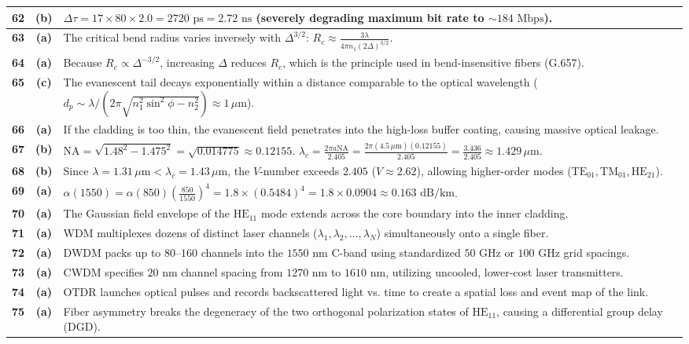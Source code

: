 {\begin{tabularx}{\textwidth}{|c|c|X|}
\textbf{62} & \textbf{(b)} & $\Delta\tau = 17 \times 80 \times 2.0 = 2720\text{ ps} = 2.72\text{ ns}$ (severely degrading maximum bit rate to $\sim 184\text{ Mbps}$). \\ \hline
\textbf{63} & \textbf{(a)} & The critical bend radius varies inversely with $\Delta^{3/2}$: $R_c \approx \frac{3\lambda}{4\pi n_1 (2\Delta)^{3/2}}$. \\ \hline
\textbf{64} & \textbf{(a)} & Because $R_c \propto \Delta^{-3/2}$, increasing $\Delta$ reduces $R_c$, which is the principle used in bend-insensitive fibers (G.657). \\ \hline
\textbf{65} & \textbf{(c)} & The evanescent tail decays exponentially within a distance comparable to the optical wavelength ($d_p \sim \lambda / (2\pi\sqrt{n_1^2\sin^2\phi - n_2^2}) \approx 1\,\mu\text{m}$). \\ \hline
\textbf{66} & \textbf{(a)} & If the cladding is too thin, the evanescent field penetrates into the high-loss buffer coating, causing massive optical leakage. \\ \hline
\textbf{67} & \textbf{(b)} & $\text{NA} = \sqrt{1.48^2 - 1.475^2} = \sqrt{0.014775} \approx 0.12155$. $\lambda_c = \frac{2\pi a \text{NA}}{2.405} = \frac{2\pi (4.5\,\mu\text{m})(0.12155)}{2.405} = \frac{3.436}{2.405} \approx 1.429\,\mu\text{m}$. \\ \hline
\textbf{68} & \textbf{(b)} & Since $\lambda = 1.31\,\mu\text{m} < \lambda_c = 1.43\,\mu\text{m}$, the $V$-number exceeds $2.405$ ($V \approx 2.62$), allowing higher-order modes ($\text{TE}_{01}, \text{TM}_{01}, \text{HE}_{21}$). \\ \hline
\textbf{69} & \textbf{(a)} & $\alpha(1550) = \alpha(850)\left(\frac{850}{1550}\right)^4 = 1.8 \times (0.5484)^4 = 1.8 \times 0.0904 \approx 0.163\text{ dB/km}$. \\ \hline
\textbf{70} & \textbf{(a)} & The Gaussian field envelope of the $\text{HE}_{11}$ mode extends across the core boundary into the inner cladding. \\ \hline
\textbf{71} & \textbf{(a)} & WDM multiplexes dozens of distinct laser channels ($\lambda_1, \lambda_2,\dots,\lambda_N$) simultaneously onto a single fiber. \\ \hline
\textbf{72} & \textbf{(a)} & DWDM packs up to $80\text{--}160$ channels into the $1550\text{ nm}$ C-band using standardized $50\text{ GHz}$ or $100\text{ GHz}$ grid spacings. \\ \hline
\textbf{73} & \textbf{(a)} & CWDM specifies $20\text{ nm}$ channel spacing from $1270\text{ nm}$ to $1610\text{ nm}$, utilizing uncooled, lower-cost laser transmitters. \\ \hline
\textbf{74} & \textbf{(a)} & OTDR launches optical pulses and records backscattered light vs. time to create a spatial loss and event map of the link. \\ \hline
\textbf{75} & \textbf{(a)} & Fiber asymmetry breaks the degeneracy of the two orthogonal polarization states of $\text{HE}_{11}$, causing a differential group delay (DGD). \\ \hline
\end{tabularx}
}

